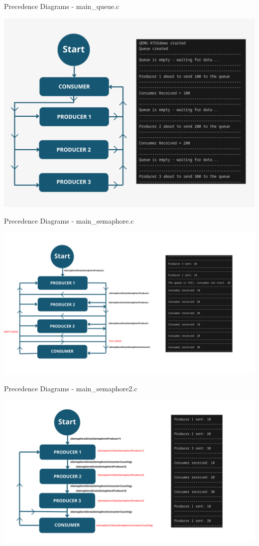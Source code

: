 \documentclass{beamer}
\begin{document}
\begin{frame}{Precedence Diagrams - main\_queue.c}

\vfill
\centering
\includegraphics[width=0.7\linewidth]{img/main_queue.png} 
\vfill
    
\end{frame}

\begin{frame}{Precedence Diagrams - main\_semaphore.c}

\vfill
\centering
\includegraphics[width=0.95\linewidth]{img/precedence_diagram_semaphore1.png} 
\vfill
    
\end{frame}

\begin{frame}{Precedence Diagrams - main\_semaphore2.c}

\vfill
\centering
\includegraphics[width=0.95\linewidth]{img/precedence_diagram_semaphore2.png} 
\vfill
    
\end{frame}
\end{document}
